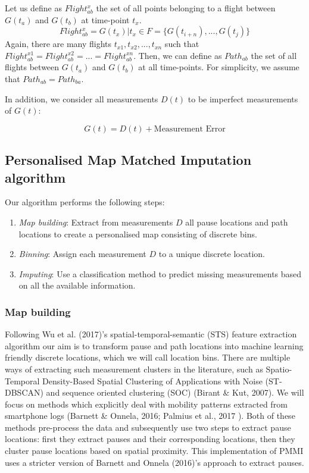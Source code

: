 \documentclass[man]{apa6}
\providecommand{\tightlist}{%
  \setlength{\itemsep}{0pt}\setlength{\parskip}{0pt}}
\theoremstyle{definition}
\theoremstyle{definition}
\theoremstyle{definition}
\theoremstyle{remark}
\begin{document}
Let us define as \(Flight^x_{ab}\) the set of all points belonging to a
flight between \(G(t_a)\) and \(G(t_b)\) at time-point \(t_x\).
\[Flight^x_{ab}= G(t_x)|t_x \in F =  \{G(t_{i+n}),...,G(t_j)\}\] Again,
there are many flights \(t_{x1},t_{x2},...,t_{xn}\) such that
\(Flight^{x1}_{ab} = Flight^{x2}_{ab} = ... = Flight^{xn}_{ab}\). Then,
we can define as \(Path_{ab}\) the set of all flights between \(G(t_a)\)
and \(G(t_b)\) at all time-points. For simplicity, we assume that
\(Path_{ab}=Path_{ba}\).

In addition, we consider all measurements \(D(t)\) to be imperfect
measurements of \(G(t)\):

\[ G(t) = D(t) + \text{Measurement Error}  \]

\subsection{Personalised Map Matched Imputation
algorithm}\label{personalised-map-matched-imputation-algorithm}

Our algorithm performs the following steps:

\begin{enumerate}
\def\labelenumi{\arabic{enumi}.}
\tightlist
\item
  \emph{Map building}: Extract from measurements \(D\) all pause
  locations and path locations to create a personalised map consisting
  of discrete bins.
\item
  \emph{Binning}: Assign each measurement \(D\) to a unique discrete
  location.
\item
  \emph{Imputing}: Use a classification method to predict missing
  measurements based on all the available information.
\end{enumerate}

\subsubsection{Map building}\label{map-building}

Following Wu et al. (2017)'s spatial-temporal-semantic (STS) feature
extraction algorithm our aim is to transform pause and path locations
into machine learning friendly discrete locations, which we will call
location bins. There are multiple ways of extracting such measurement
clusters in the literature, such as Spatio-Temporal Density-Based
Spatial Clustering of Applications with Noise (ST-DBSCAN) and sequence
oriented clustering (SOC) (Birant \& Kut, 2007). We will focus on
methods which explicitly deal with mobility patterns extracted from
smartphone logs (Barnett \& Onnela, 2016; Palmius et al., 2017 ). Both
of these methods pre-process the data and subsequently use two steps to
extract pause locations: first they extract pauses and their
corresponding locations, then they cluster pause locations based on
spatial proximity. This implementation of PMMI uses a stricter version
of Barnett and Onnela (2016)'s approach to extract pauses.
\end{document}
